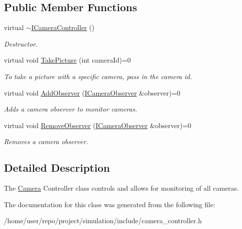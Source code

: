 \subsection*{Public Member Functions}
\begin{DoxyCompactItemize}
\item 
\mbox{\label{classICameraController_a7f1b88c7e023ad218d461684dc0d4fe5}} 
virtual \hyperlink{classICameraController_a7f1b88c7e023ad218d461684dc0d4fe5}{$\sim$\+I\+Camera\+Controller} ()
\begin{DoxyCompactList}\small\item\em Destructor. \end{DoxyCompactList}\item 
\mbox{\label{classICameraController_af9fff22819969ca260f7f098f0cdebf4}} 
virtual void \hyperlink{classICameraController_af9fff22819969ca260f7f098f0cdebf4}{Take\+Picture} (int camera\+Id)=0
\begin{DoxyCompactList}\small\item\em To take a picture with a specific camera, pass in the camera id. \end{DoxyCompactList}\item 
\mbox{\label{classICameraController_ad3cf56dc052984b0e31e602f344c35db}} 
virtual void \hyperlink{classICameraController_ad3cf56dc052984b0e31e602f344c35db}{Add\+Observer} (\hyperlink{classICameraObserver}{I\+Camera\+Observer} \&observer)=0
\begin{DoxyCompactList}\small\item\em Adds a camera observer to monitor cameras. \end{DoxyCompactList}\item 
\mbox{\label{classICameraController_a5013bc29f6a0e7794a97646d868bf809}} 
virtual void \hyperlink{classICameraController_a5013bc29f6a0e7794a97646d868bf809}{Remove\+Observer} (\hyperlink{classICameraObserver}{I\+Camera\+Observer} \&observer)=0
\begin{DoxyCompactList}\small\item\em Removes a camera observer. \end{DoxyCompactList}\end{DoxyCompactItemize}


\subsection{Detailed Description}
The \hyperlink{classCamera}{Camera} Controller class controls and allows for monitoring of all cameras. 

The documentation for this class was generated from the following file\+:\begin{DoxyCompactItemize}
\item 
/home/user/repo/project/simulation/include/camera\+\_\+controller.\+h\end{DoxyCompactItemize}
